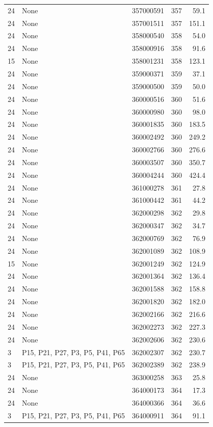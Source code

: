 \documentclass{template/openetcs_article}
\begin{document}
\begin{longtable}{|l |l |l |l |r |}
24 & None & 357000591 & 357 & 59.1 \\
24 & None & 357001511 & 357 & 151.1 \\
24 & None & 358000540 & 358 & 54.0 \\
24 & None & 358000916 & 358 & 91.6 \\
15 & None & 358001231 & 358 & 123.1 \\
24 & None & 359000371 & 359 & 37.1 \\
24 & None & 359000500 & 359 & 50.0 \\
24 & None & 360000516 & 360 & 51.6 \\
24 & None & 360000980 & 360 & 98.0 \\
24 & None & 360001835 & 360 & 183.5 \\
24 & None & 360002492 & 360 & 249.2 \\
24 & None & 360002766 & 360 & 276.6 \\
24 & None & 360003507 & 360 & 350.7 \\
24 & None & 360004244 & 360 & 424.4 \\
24 & None & 361000278 & 361 & 27.8 \\
24 & None & 361000442 & 361 & 44.2 \\
24 & None & 362000298 & 362 & 29.8 \\
24 & None & 362000347 & 362 & 34.7 \\
24 & None & 362000769 & 362 & 76.9 \\
24 & None & 362001089 & 362 & 108.9 \\
15 & None & 362001249 & 362 & 124.9 \\
24 & None & 362001364 & 362 & 136.4 \\
24 & None & 362001588 & 362 & 158.8 \\
24 & None & 362001820 & 362 & 182.0 \\
24 & None & 362002166 & 362 & 216.6 \\
24 & None & 362002273 & 362 & 227.3 \\
24 & None & 362002606 & 362 & 230.6 \\
3 & P15, P21, P27, P3, P5, P41, P65 & 362002307 & 362 & 230.7 \\
3 & P15, P21, P27, P3, P5, P41, P65 & 362002389 & 362 & 238.9 \\
24 & None & 363000258 & 363 & 25.8 \\
24 & None & 364000173 & 364 & 17.3 \\
24 & None & 364000366 & 364 & 36.6 \\
3 & P15, P21, P27, P3, P5, P41, P65 & 364000911 & 364 & 91.1 \\

\end{longtable}
\end{document}
